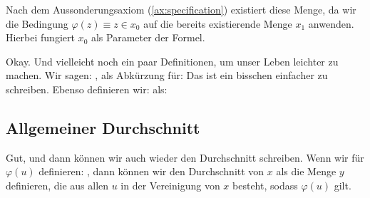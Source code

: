 \begin{math-stroke}
\begin{explanation-of-steps}
Nach dem Aussonderungsaxiom (\cref{ax:specification}) existiert diese Menge, da wir die Bedingung $\varphi(z) \equiv z \in x_0$ auf die bereits existierende Menge $x_1$ anwenden. Hierbei fungiert $x_0$ als Parameter der Formel.
\end{explanation-of-steps}
\end{math-stroke}

\begin{spoken-clean}[00:35:00 - 00:36:56]
Okay. Und vielleicht noch ein paar Definitionen, um unser Leben leichter zu machen. Wir sagen: , als Abkürzung für:  Das ist ein bisschen einfacher zu schreiben. Ebenso definieren wir:  als: 
\end{spoken-clean}

\subsection{Allgemeiner Durchschnitt}
\begin{spoken-clean}[continued]
Gut, und dann können wir auch wieder den Durchschnitt schreiben. Wenn wir für $\varphi(u)$ definieren: , dann können wir den Durchschnitt von $x$ als die Menge $y$ definieren, die aus allen $u$ in der Vereinigung von $x$ besteht, sodass $\varphi(u)$ gilt.
\end{spoken-clean}

\begin{math-stroke}
\end{math-stroke}

